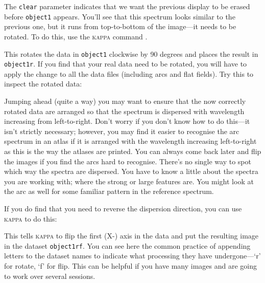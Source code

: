 \documentclass[twoside,11pt]{starlink}
\providecommand{\scspec}[2]{#1}
\begin{document}
The \verb+clear+ parameter indicates that we want the previous display to
be erased before \verb+object1+ appears.
You'll see that this spectrum looks similar to the previous one, but it runs
from top-to-bottom of the image\scspec{---}{ - }it needs to be rotated.
To do this, use the \textsc{kappa} command .

{
\scspec{\small}{ }
\begin{terminalv}
\end{terminalv}
}

This rotates the data in \verb+object1+ clockwise by 90 degrees and places
the result in \verb+object1r+\@.  If you find that your real data need to be
rotated, you will have to apply the change to all the data files (including
arcs and flat fields).  Try this to inspect the rotated data:

{
\scspec{\small}{ }
\begin{terminalv}
\end{terminalv}
}

Jumping ahead (quite a way) you may want to ensure that the now correctly
rotated data are arranged so that the spectrum is dispersed with wavelength
increasing from left-to-right.  Don't worry if you don't know how to do
this\scspec{---}{ - }it isn't strictly necessary; however, you may find it
easier to recognise the arc spectrum in an atlas if it is arranged with the
wavelength increasing left-to-right as this is the way the atlases are
printed.
You can always come back later and flip the images if you find the arcs hard
to recognise.
There's no single way to spot which way the spectra are dispersed.
You have to know a little about the spectra you are working with;
where the strong or large features are.  You might look at the arc as
well for some familiar pattern in the reference spectrum.

If you do find that you need to reverse the dispersion direction, you can use
\textsc{kappa}  to do this:

{
\scspec{\small}{ }
\begin{terminalv}
\end{terminalv}
}

This tells \textsc{kappa} to flip the first (X-) axis in the data and put
the resulting image in the dataset \verb+object1rf+\@.
You can see here the common practice of appending letters to the
dataset names to indicate what processing they have
undergone\scspec{---}{ - }`r' for rotate, `f' for flip.
This can be helpful if you have many images and are going to work
over several sessions.
\end{document}
